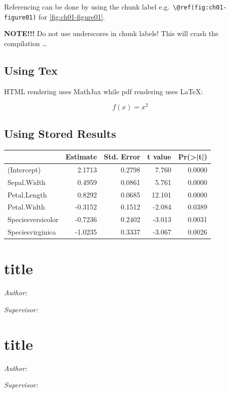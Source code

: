 \documentclass[
]{krantz}
\begin{document}
Referencing can be done by using the chunk label e.g.~\texttt{\textbackslash{}@ref(fig:ch01-figure01)} for \ref{fig:ch01-figure01}.

\textbf{NOTE!!!} Do not use underscores in chunk labels! This will crash the compilation \ldots{}

\hypertarget{using-tex}{%
\section{Using Tex}\label{using-tex}}

HTML rendering uses MathJax while pdf rendering uses LaTeX:

\[
f(x) = x^2
\]

\hypertarget{using-stored-results}{%
\section{Using Stored Results}\label{using-stored-results}}

\begin{tabular}{l|r|r|r|r}
\hline
  & Estimate & Std. Error & t value & Pr(>|t|)\\
\hline
(Intercept) & 2.1713 & 0.2798 & 7.760 & 0.0000\\
\hline
Sepal.Width & 0.4959 & 0.0861 & 5.761 & 0.0000\\
\hline
Petal.Length & 0.8292 & 0.0685 & 12.101 & 0.0000\\
\hline
Petal.Width & -0.3152 & 0.1512 & -2.084 & 0.0389\\
\hline
Speciesversicolor & -0.7236 & 0.2402 & -3.013 & 0.0031\\
\hline
Speciesvirginica & -1.0235 & 0.3337 & -3.067 & 0.0026\\
\hline
\end{tabular}

\hypertarget{title}{%
\chapter{title}\label{title}}

\emph{Author: }

\emph{Supervisor: }

\hypertarget{title-1}{%
\chapter{title}\label{title-1}}

\emph{Author: }

\emph{Supervisor: }
\end{document}

